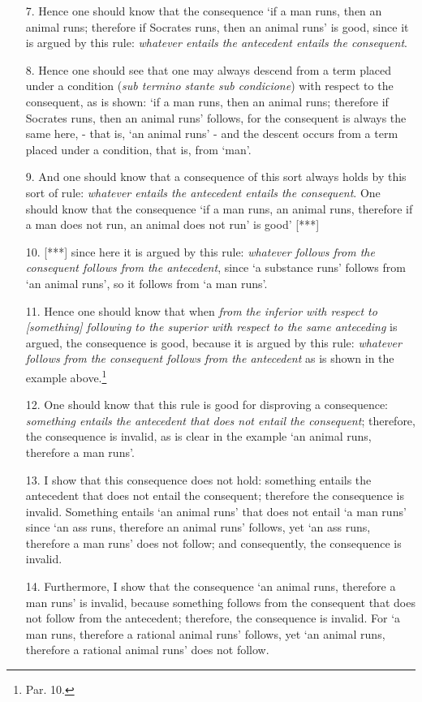 \documentclass[]{article}
\begin{document}
\begin{enumerate}
\item[7.] Hence one should know that the consequence `if a man runs, then an animal runs; therefore if Socrates runs, then an animal runs' is good, since it is argued by this rule: \textit{whatever entails the antecedent entails the consequent}.
\item[8.] Hence one should see that one may always descend from a term placed under a condition (\textit{sub termino stante sub condicione}) with respect to the consequent, as is shown: `if a man runs, then an animal runs; therefore if Socrates runs, then an animal runs' follows, for the consequent is always the same here, - that is, `an animal runs' - and the descent occurs from a term placed under a condition, that is, from `man'.
\item[9.] And one should know that a consequence of this sort always holds by this sort of rule: \textit{whatever entails the antecedent entails the consequent}. One should know that the consequence `if a man runs, an animal runs, therefore if a man does not run, an animal does not run' is good' [***]
\item[10.] [***] since here it is argued by this rule: \textit{whatever follows from the consequent follows from the antecedent}, since `a substance runs' follows from `an animal runs', so it follows from `a man runs'. 
\item[11.] Hence one should know that when \textit{from the inferior with respect to [something] following to the superior with respect to the same anteceding} is argued, the consequence is good, because it is argued by this rule: \textit{whatever follows from the consequent follows from the antecedent} as is shown in the example above.\footnote{Par. 10.}
\item[12.] One should know that this rule is good for disproving a consequence: \textit{something entails the antecedent that does not entail the consequent}; therefore, the consequence is invalid, as is clear in the example `an animal runs, therefore a man runs'.
\item[13.] I show that this consequence does not hold: something entails the antecedent that does not entail the consequent; therefore the consequence is invalid. Something entails `an animal runs' that does not entail `a man runs' since `an ass runs, therefore an animal runs' follows, yet `an ass runs, therefore a man runs' does not follow; and consequently, the consequence is invalid.
\item[14.] Furthermore, I show that the consequence `an animal runs, therefore a man runs' is invalid, because something follows from the consequent that does not follow from the antecedent; therefore, the consequence is invalid. For `a man runs, therefore a rational animal runs' follows, yet `an animal runs, therefore a rational animal runs' does not follow.

\end{enumerate}
\end{document}
